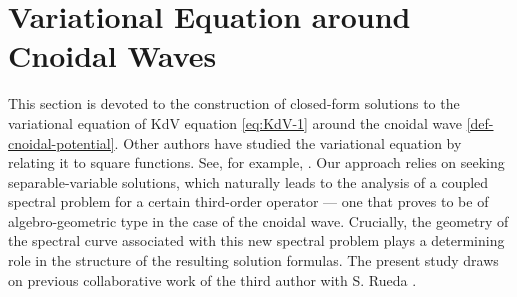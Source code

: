\documentclass[a4paper,12pt]{article}
\def\para{\vspace{1.5 mm}}
\begin{document}

\section{Variational Equation around Cnoidal Waves}\label{sec-VE}


This section is devoted to the construction of closed-form solutions to the variational equation of KdV equation \eqref{eq:KdV-1} around the cnoidal wave \eqref{def-cnoidal-potential}. Other authors have studied the variational equation by relating it to square functions. See, for example, \cite{AiraultMcKeanMoser1977, Kapitula2008, Sachs1983, HaragusSattinger1998, PegoWeinstein1994}. Our approach relies on seeking separable-variable solutions, which naturally leads to the analysis of a coupled spectral problem for a certain third-order operator — one that proves to be of algebro-geometric type in the case of the cnoidal wave. Crucially, the geometry of the spectral curve associated with this new spectral problem plays a determining role in the structure of the resulting solution formulas. The present study draws on previous collaborative work of the third author with S. Rueda \cite{ZurroSevilla, RZ2021factoring}.
\end{document}

